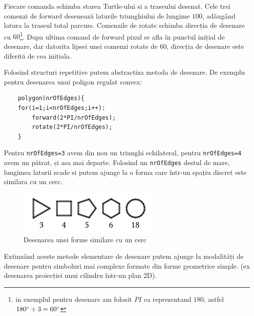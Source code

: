 Fiecare comanda schimba starea Turtle-ului si a traseului desenat. 
Cele trei comenzi de forward desenează laturile triunghiului de lungime \(100\), adăugând latura la traseul total parcurs. 
Comenzile de rotate schimba direcția de desenare cu \(60\)\degree \footnote{in exemplul pentru desenare am folosit \(PI\) ca reprezentand \(180\)\degree, astfel \(180\degree \div 3 = 60\degree\)}. 
Dupa ultima comand de forward pixul se afla în punctul inițial de desenare, dar datorita lipsei unei comenzi rotate de \(60\)\degree, 
direcția de desenare este diferită de cea inițiala.\newline

Folosind structuri repetitive putem abstractiza metoda de desenare. De exemplu pentru desenarea unui poligon regulat convex:

\begin{lstlisting}
    polygon(nrOfEdges){
    for(i=1;i<nrOfEdges;i++):
        forward(2*PI/nrOfEdges);
        rotate(2*PI/nrOfEdges);	
    }
\end{lstlisting}

Pentru \verb|nrOfEdges=3| avem din nou un triunghi echilateral, pentru \verb|nrOfEdges=4| avem un pătrat, și asa mai departe. 
Folosind un \verb|nrOfEdges| destul de mare, lungimea laturii scade si  putem ajunge la o forma care într-un spațiu discret 
este similara cu un cerc.\newline 

\begin{figure}[H]
    \begin{center}
        \includegraphics[scale=1]{imagini/turtle/circle.png}
        \caption{Desenarea unei forme similare cu un cerc}
        \label{fig:tabs}
    \end{center}    
\end{figure}

Extinzând aceste metode elementare de desenare putem ajunge la modalități de desenare pentru simboluri mai complexe 
formate din forme geometrice simple. (ex desenarea proiecției unui cilindru într-un plan 2D). \newline

